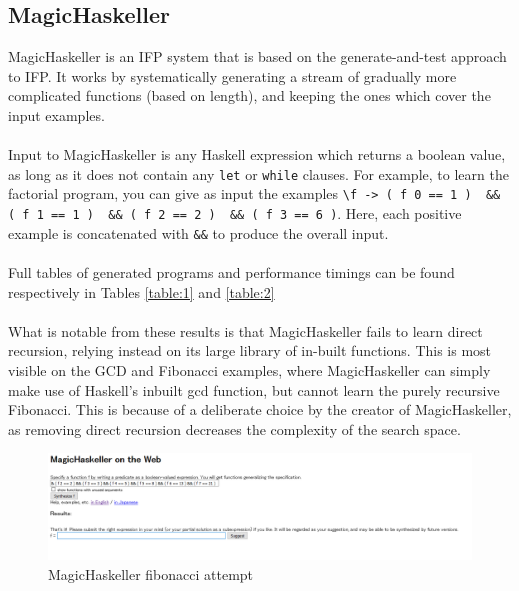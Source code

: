 \subsection{MagicHaskeller}
MagicHaskeller \cite{Katayama2012} is an IFP system that is based on the generate-and-test approach to IFP. It works by systematically generating a stream of gradually more complicated functions (based on length), and keeping the ones which cover the input examples. \\ \\
Input to MagicHaskeller is any Haskell expression which returns a boolean value, as long as it does not contain any \lstinline{let} or \lstinline{while} clauses. For example, to learn the factorial program, you can give as input the examples \lstinline{\f -> ( f 0 == 1 )  && ( f 1 == 1 )  && ( f 2 == 2 )  && ( f 3 == 6 )}. Here, each positive example is concatenated with \lstinline{&&} to produce the overall input.\\ \\
Full tables of generated programs and performance timings can be found respectively in Tables \ref{table:1} and \ref{table:2} \\ \\
What is notable from these results is that MagicHaskeller fails to learn direct recursion, relying instead on its large library of in-built functions. This is most visible on the GCD and Fibonacci examples, where MagicHaskeller can simply make use of Haskell's inbuilt gcd function, but cannot learn the purely recursive Fibonacci. This is because of a deliberate choice by the creator of MagicHaskeller, as removing direct recursion decreases the complexity of the search space.

\begin{figure}[h!]
\centering
\includegraphics[width=\textwidth]{C7/magichaskeller_fail.png}
\caption{MagicHaskeller fibonacci attempt}
\label{fig:magichaskeller_fail}
\end{figure}

\Suppressnumber

